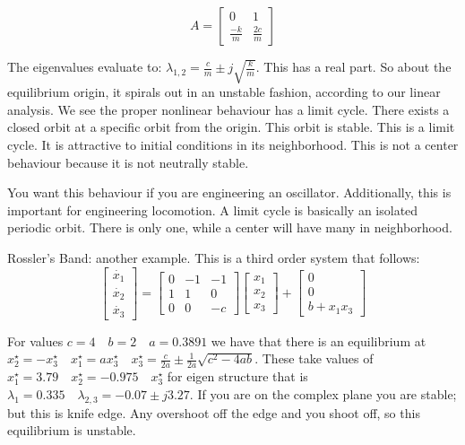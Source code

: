 \documentclass[11pt]{article}
\begin{document}
\begin{equation}A = 
\begin{bmatrix}
0 & 1\\
\frac{-k}{m} & \frac{2c}{m}
\end{bmatrix}
\end{equation}

The eigenvalues evaluate to: $\lambda_{1,2} = \frac{c}{m}\pm j \sqrt{\frac{k}{m}}$. This has a real part. So about the equilibrium origin, it spirals out in an unstable fashion, according to our linear analysis. We see the proper nonlinear behaviour has a limit cycle. There exists a closed orbit at a specific orbit from the origin. This orbit is stable. This is a limit cycle. It is attractive to initial conditions in its neighborhood. This is not a center behaviour because it is not neutrally stable. 

You want this behaviour if you are engineering an oscillator. Additionally, this is important for engineering locomotion. A limit cycle is basically an isolated periodic orbit. There is only one, while a center will have many in neighborhood.

Rossler's Band: another example. This is a third order system that follows:
\begin{equation}
\begin{bmatrix}
\dot{x_1} \\
\dot{x_2} \\
\dot{x_3}
\end{bmatrix}
=
\begin{bmatrix}
0 & -1 & -1\\
1 & 1 & 0 \\
0 & 0 & -c
\end{bmatrix}
\begin{bmatrix}
{x_1} \\
{x_2} \\
x_3
\end{bmatrix}
+
\begin{bmatrix}
0 \\ 0\\ b+x_1x_3
\end{bmatrix}
\end{equation}

For values $c=4 \quad b=2 \quad a =0.3891$ we have that there is an equilibrium at $x_2^\star = -x_3^\star \quad x_1^\star = ax_3^\star \quad x_3^\star = \frac{c}{2a} \pm \frac{1}{2a}\sqrt{c^2-4ab}$. These take values of $x_1^\star=3.79 \quad x_2^\star= -0.975 \quad x_3^\star$ for eigen structure that is $\lambda_1 = 0.335 \quad \lambda_{2,3}=-0.07\pm j3.27$. If you are on the complex plane you are stable; but this is knife edge. Any overshoot off the edge and you shoot off, so this equilibrium is unstable.
\end{document}
